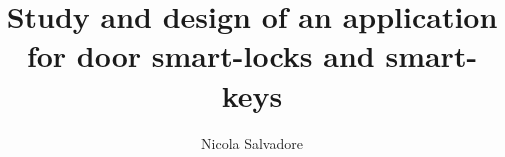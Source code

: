 \title{Study and design of an application for door smart-locks and smart-keys}
\author{Nicola Salvadore}


